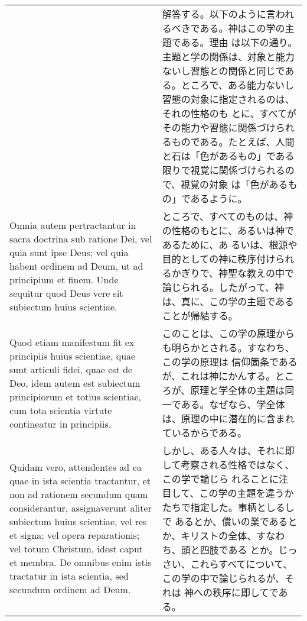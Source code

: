 \documentclass[10pt]{jsarticle}
\begin{document}
\begin{longtable}{p{21em}p{21em}}
&

解答する。以下のように言われるべきである。神はこの学の主題である。理由
は以下の通り。主題と学の関係は、対象と能力ないし習態との関係と同じであ
る。ところで、ある能力ないし習態の対象に指定されるのは、それの性格のも
とに、すべてがその能力や習態に関係づけられるものである。たとえば、人間
と石は「色があるもの」である限りで視覚に関係づけられるので、視覚の対象
は「色があるもの」であるように。


\\


Omnia autem pertractantur in sacra doctrina sub ratione Dei, vel quia
sunt ipse Deus; vel quia habent ordinem ad Deum, ut ad principium et
finem. Unde sequitur quod Deus vere sit subiectum huius scientiae.




&

ところで、すべてのものは、神の性格のもとに、あるいは神であるために、あ
るいは、根源や目的としての神に秩序付けられるかぎりで、神聖な教えの中で
論じられる。したがって、神は、真に、この学の主題であることが帰結する。



\\

Quod etiam manifestum fit ex principiis huius scientiae, quae sunt
articuli fidei, quae est de Deo, idem autem est subiectum principiorum
et totius scientiae, cum tota scientia virtute contineatur in
principiis.


&

このことは、この学の原理からも明らかとされる。すなわち、この学の原理は
信仰箇条であるが、これは神にかんする。ところが、原理と学全体の主題は同
一である。なぜなら、学全体は、原理の中に潜在的に含まれているからである。


\\

Quidam vero, attendentes ad ea quae in ista scientia tractantur, et
non ad rationem secundum quam considerantur, assignaverunt aliter
subiectum huius scientiae, vel res et signa; vel opera reparationis;
vel totum Christum, idest caput et membra. De omnibus enim istis
tractatur in ista scientia, sed secundum ordinem ad Deum.


&

しかし、ある人々は、それに即して考察される性格ではなく、この学で論じら
れることに注目して、この学の主題を違うかたちで指定した。事柄としるしで
あるとか、償いの業であるとか、キリストの全体、すなわち、頭と四肢である
とか。じっさい、これらすべてについて、この学の中で論じられるが、それは
神への秩序に即してである。



\end{longtable}
\end{document}
